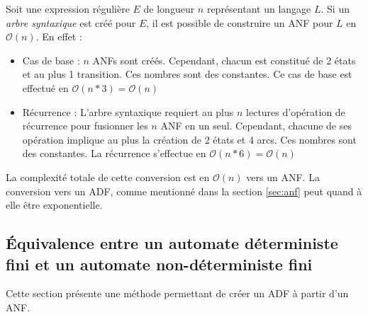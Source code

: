 \begin{complexity}
	Soit une expression régulière $E$ de longueur $n$ représentant un langage $L$. Si un \emph{arbre syntaxique} est créé pour $E$, il est possible de construire un ANF pour $L$ en $\mathcal{O}(n)$. En effet :
	\begin{itemize}
		\item Cas de base : $n$ ANFs sont créés. Cependant, chacun est constitué de 2 états et au plus 1 transition. Ces nombres sont des constantes. Ce cas de base est effectué en $\mathcal{O}(n*3)=\mathcal{O}(n)$
		\item Récurrence : L'arbre syntaxique requiert au plus $n$ lectures d'opération de récurrence pour fusionner les $n$ ANF en un seul. Cependant, chacune de ses opération implique au plus la création de 2 états et 4 arcs. Ces nombres sont des constantes. La récurrence s'effectue en $\mathcal{O}(n*6)=\mathcal{O}(n)$
	\end{itemize}

	La complexité totale de cette conversion est en $\mathcal{O}(n)$ vers un ANF. La conversion vers un ADF, comme mentionné dans la section \ref{sec:anf} peut quand à elle être exponentielle.

\end{complexity}




\subsection{Équivalence entre un automate déterministe fini et un automate non-déterministe fini}\label{ss:eqadfanf}
Cette section présente une méthode permettant de créer un ADF à partir d'un ANF.

